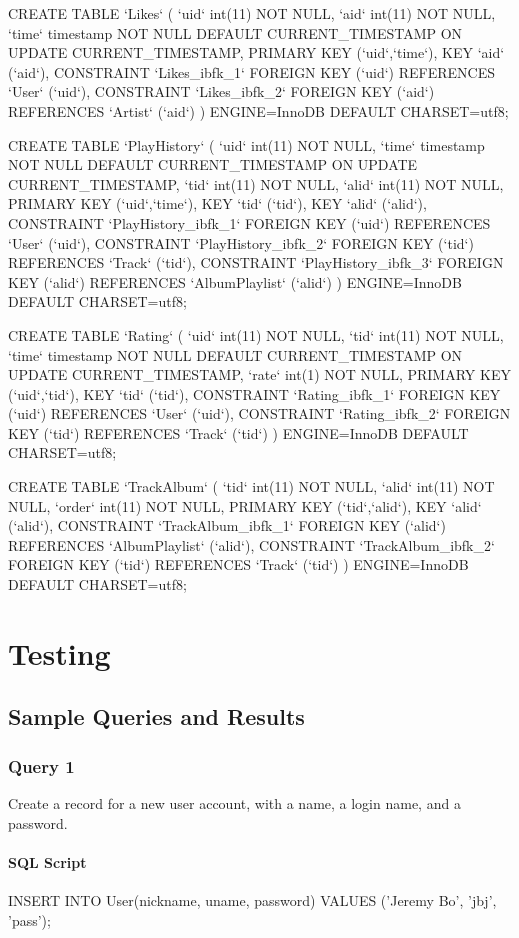 \documentclass[letter, 12pt]{report}
\begin{document}
\begin{spverbatim}
	CREATE TABLE `Likes` (
	`uid` int(11) NOT NULL,
	`aid` int(11) NOT NULL,
	`time` timestamp NOT NULL DEFAULT CURRENT_TIMESTAMP ON UPDATE CURRENT_TIMESTAMP,
	PRIMARY KEY (`uid`,`time`),
	KEY `aid` (`aid`),
	CONSTRAINT `Likes_ibfk_1` FOREIGN KEY (`uid`) REFERENCES `User` (`uid`),
	CONSTRAINT `Likes_ibfk_2` FOREIGN KEY (`aid`) REFERENCES `Artist` (`aid`)
	) ENGINE=InnoDB DEFAULT CHARSET=utf8;
	
	CREATE TABLE `PlayHistory` (
	`uid` int(11) NOT NULL,
	`time` timestamp NOT NULL DEFAULT CURRENT_TIMESTAMP ON UPDATE CURRENT_TIMESTAMP,
	`tid` int(11) NOT NULL,
	`alid` int(11) NOT NULL,
	PRIMARY KEY (`uid`,`time`),
	KEY `tid` (`tid`),
	KEY `alid` (`alid`),
	CONSTRAINT `PlayHistory_ibfk_1` FOREIGN KEY (`uid`) REFERENCES `User` (`uid`),
	CONSTRAINT `PlayHistory_ibfk_2` FOREIGN KEY (`tid`) REFERENCES `Track` (`tid`),
	CONSTRAINT `PlayHistory_ibfk_3` FOREIGN KEY (`alid`) REFERENCES `AlbumPlaylist` (`alid`)
	) ENGINE=InnoDB DEFAULT CHARSET=utf8;
	
	CREATE TABLE `Rating` (
	`uid` int(11) NOT NULL,
	`tid` int(11) NOT NULL,
	`time` timestamp NOT NULL DEFAULT CURRENT_TIMESTAMP ON UPDATE CURRENT_TIMESTAMP,
	`rate` int(1) NOT NULL,
	PRIMARY KEY (`uid`,`tid`),
	KEY `tid` (`tid`),
	CONSTRAINT `Rating_ibfk_1` FOREIGN KEY (`uid`) REFERENCES `User` (`uid`),
	CONSTRAINT `Rating_ibfk_2` FOREIGN KEY (`tid`) REFERENCES `Track` (`tid`)
	) ENGINE=InnoDB DEFAULT CHARSET=utf8;
	
	CREATE TABLE `TrackAlbum` (
	`tid` int(11) NOT NULL,
	`alid` int(11) NOT NULL,
	`order` int(11) NOT NULL,
	PRIMARY KEY (`tid`,`alid`),
	KEY `alid` (`alid`),
	CONSTRAINT `TrackAlbum_ibfk_1` FOREIGN KEY (`alid`) REFERENCES `AlbumPlaylist` (`alid`),
	CONSTRAINT `TrackAlbum_ibfk_2` FOREIGN KEY (`tid`) REFERENCES `Track` (`tid`)
	) ENGINE=InnoDB DEFAULT CHARSET=utf8;
	\end{spverbatim}
	
	\chapter{Testing}
	\section{Sample Queries and Results}
	\subsection{Query 1}
	Create a record for a new user account, with a name, a login name, and a password.
	\subsubsection{SQL Script}
	\begin{spverbatim}
		INSERT INTO User(nickname, uname, password) VALUES ('Jeremy Bo', 'jbj', 'pass');
	\end{spverbatim}
\end{document}
